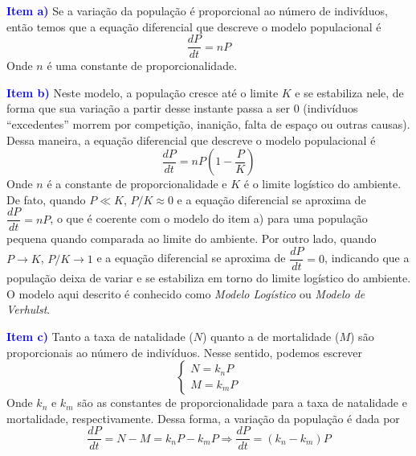 \documentclass[oneside,12pt,a4paper]{report}
\begin{document}

        \begin{tcolorbox}[enhanced, breakable, colback=blue!1!white,colframe=blue!75!black,title=\textbf{\hyperlink{quest:ex10}{\hypertarget{resp:ex10}{Exercício 10}}}]
        \noindent\textcolor{blue}{\textbf{Item a)}} Se a variação da população é proporcional ao número de indivíduos, então temos que a equação diferencial que descreve o modelo populacional é
        \[\frac{dP}{dt} = nP\]
        \noindent Onde $n$ é uma constante de proporcionalidade.

        \noindent\textcolor{blue}{\textbf{Item b)}} Neste modelo, a população cresce até o limite $K$ e se estabiliza nele, de forma que sua variação a partir desse instante passa a ser $0$ (indivíduos ``excedentes'' morrem por competição, inanição, falta de espaço ou outras causas). Dessa maneira, a equação diferencial que descreve o modelo populacional é
        \[\frac{dP}{dt} = nP\left(1-\frac{P}{K}\right)\]
        \noindent Onde $n$ é a constante de proporcionalidade e $K$ é o limite logístico do ambiente. De fato, quando $P\ll K$, $P/K\approx 0$ e a equação diferencial se aproxima de $\dfrac{dP}{dt} = nP$, o que é coerente com o modelo do item a) para uma população pequena quando comparada ao limite do ambiente. Por outro lado, quando $P\rightarrow K$, $P/K \rightarrow 1$ e a equação diferencial se aproxima de $\dfrac{dP}{dt} = 0$, indicando que a população deixa de variar e se estabiliza em torno do limite logístico do ambiente. O modelo aqui descrito é conhecido como \textit{Modelo Logístico} ou \textit{Modelo de Verhulst}.

        \noindent\textcolor{blue}{\textbf{Item c)}} Tanto a taxa de natalidade ($N$) quanto a de mortalidade ($M$) são proporcionais ao número de indivíduos. Nesse sentido, podemos escrever
        \[\begin{cases}
            N = k_nP\\
            M = k_mP
        \end{cases}\]
        Onde $k_n$ e $k_m$ são as constantes de proporcionalidade para a taxa de natalidade e mortalidade, respectivamente. Dessa forma, a variação da população é dada por
        \[\frac{dP}{dt} = N - M = k_nP - k_mP \Rightarrow \boxed{\frac{dP}{dt}=(k_n-k_m)P}\]
        \end{tcolorbox}
\end{document}
